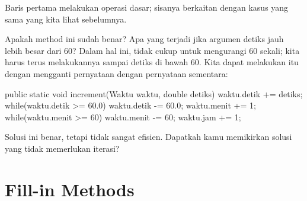 Baris pertama melakukan operasi dasar; sisanya berkaitan dengan kasus yang sama yang kita lihat sebelumnya.

Apakah method ini sudah benar? Apa yang terjadi jika argumen detiks jauh lebih besar dari 60? Dalam hal ini, tidak cukup untuk mengurangi 60 sekali; kita harus terus melakukannya sampai detiks di bawah 60. Kita dapat melakukan itu dengan mengganti pernyataan dengan pernyataan sementara:

\newline
public static void increment(Waktu waktu, double detiks)\textbraceleft \newline
	waktu.detik += detiks; \newline
\newline
	while(waktu.detik \textgreater = 60.0)\textbraceleft \newline
		waktu.detik -= 60.0; \newline
		waktu.menit += 1; \newline
	\textbraceright \newline
\newline
	while(waktu.menit \textgreater = 60)\textbraceleft \newline
		waktu.menit -= 60; \newline
		waktu.jam += 1; \newline
	\textbraceright \newline
\textbraceright \newline

Solusi ini benar, tetapi tidak sangat efisien. Dapatkah kamu memikirkan solusi yang tidak memerlukan iterasi?

\section{Fill-in Methods}

